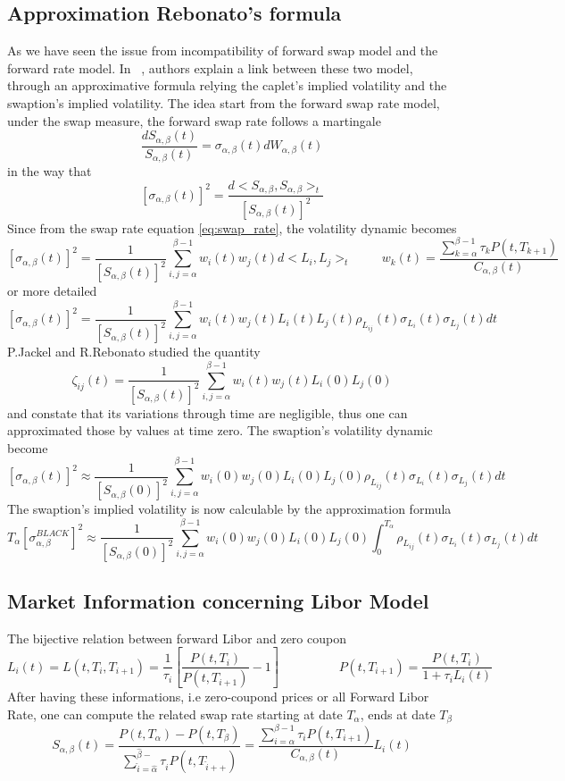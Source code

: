 \documentclass[a4paper,10pt]{article}
\newcommand{\Ti}{T_{i}}
\newcommand{\Ta}{T_{\alpha}}
\newcommand{\Tii}{T_{i+1}}
\newcommand{\Pti}{P(t,T_{i})}
\newcommand{\Ptii}{P(t,T_{i+1})}
\newcommand{\Lit}{L_{i}(t)}
\newcommand{\Sab}{S_{\alpha,\beta}}
\newcommand{\Cab}{C_{\alpha,\beta}}
\newcommand{\Wab}{W_{\alpha,\beta}}
\newcommand{\sigmaab}{\sigma_{\alpha,\beta}}
\begin{document}
\subsection{Approximation Rebonato's formula}
As we have seen the issue from incompatibility of forward swap model and the forward rate model. In ~\cite{JACKEL2003}, authors explain a link between these two model, through an approximative formula relying the caplet's implied volatility and the swaption's implied volatility. The idea start from the forward swap rate model, under the swap measure, the forward swap rate follows a martingale
\[
\frac{d\Sab(t)}{\Sab(t)} = \sigmaab(t)d\Wab(t)
\] 
in the way that 
\[
[\sigmaab(t)]^2 = \frac{ d<\Sab,\Sab>_t }{[\Sab(t)]^2 }
\]
Since from the swap rate equation \ref{eq:swap_rate}, the volatility dynamic becomes
\[
[\sigmaab(t)]^2 = \frac{1}{[\Sab(t)]^2 } \sum_{i,j=\alpha}^{\beta-1} w_i(t)w_j(t) d<L_i,L_j>_t
\hspace{1cm}
w_k(t) = \frac{\sum^{\beta-1}_{k=\alpha} \tau_k P(t,T_{k+1}) }{\Cab(t)}
\]
or more detailed
\[
[\sigmaab(t)]^2 = \frac{1}{[\Sab(t)]^2 } \sum_{i,j=\alpha}^{\beta-1} w_i(t)w_j(t) L_i(t)L_j(t) \rho_{L_{ij}}(t) \sigma_{L_i}(t) \sigma_{L_j}(t) dt
\]
P.Jackel and R.Rebonato studied the quantity
\[
\zeta_{ij}(t) = \frac{1}{[\Sab(t)]^2 } \sum_{i,j=\alpha}^{\beta-1} w_i(t)w_j(t) L_i(0)L_j(0)
\]
and constate that its variations through time are negligible, thus one can approximated those by values at time zero. The swaption's volatility dynamic become
\[
[\sigmaab(t)]^2 \approx \frac{1}{[\Sab(0)]^2 } \sum_{i,j=\alpha}^{\beta-1} w_i(0)w_j(0)L_i(0)L_j(0) \rho_{L_{ij}}(t) \sigma_{L_i}(t) \sigma_{L_j}(t) dt
\]
The swaption's implied volatility is now calculable by the approximation formula
\begin{equation}
\label{eq:rebonato}
\Ta[\sigma^{BLACK}_{\alpha,\beta}]^2 \approx \frac{1}{[\Sab(0)]^2 } \sum_{i,j=\alpha}^{\beta-1} w_i(0)w_j(0)L_i(0)L_j(0) 
\int_{0}^{\Ta} \rho_{L_{ij}}(t) \sigma_{L_i}(t) \sigma_{L_j}(t) dt
\end{equation}

\newpage


\subsection{Market Information concerning Libor Model}
The bijective relation between forward Libor and zero coupon
\begin{equation}
\label{eq:libor_zc}
L_i(t) = L(t,\Ti,\Tii) = \frac{1}{\tau_i} \left[ \frac{\Pti}{\Ptii} - 1  \right]
\hspace{2cm}
{\Ptii} = \frac{\Pti}{1+ \tau_i L_i(t)}
\end{equation}
After having these informations, i.e zero-coupond prices or all Forward Libor Rate, one can compute the related swap rate starting at date $T_{\alpha}$, ends at date $T_{\beta}$
\begin{equation}
\label{eq:swap_rate}
S_{\alpha,\beta}(t) 
= 
\frac{P(t,T_{\alpha})-P(t,T_{\beta})}{\sum^{\hat{\beta}-}_{\hat{i}=\hat{\alpha}}\tau_{\hat{i}}P(t,T_{\hat{i}++})} 
=
\frac{\sum^{\beta-1}_{i=\alpha} \tau_i \Ptii }{\Cab(t)} \Lit
\end{equation}
\end{document}
